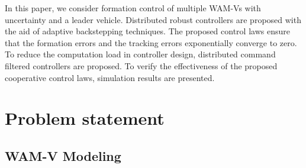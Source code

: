 \documentclass[letterpaper, 10 pt, conference]{ieeeconf}  %
\begin{document}
In this paper, we consider formation control of multiple WAM-Vs with uncertainty and a leader vehicle. Distributed robust controllers are proposed with the aid of adaptive backstepping techniques. 
The proposed control laws ensure that the formation errors and the tracking errors exponentially converge to zero. To reduce the computation load in controller design, distributed command filtered controllers are proposed.  To verify the effectiveness of the proposed
cooperative control laws, simulation results are presented.
%


\section{Problem statement }
\label{sec2}

%
%


\subsection{WAM-V Modeling}
\label{model}
\end{document}
